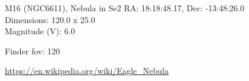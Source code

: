 \begin{block}{M16 (NGC6611), Nebula in Se2}
    RA: 18:18:48.17, Dec: -13:48:26.0 \\ 
    Dimensions: 120.0 x 25.0 \\ 
    Magnitude (V): 6.0



    Finder fov: 120 

    \url{https://en.wikipedia.org/wiki/Eagle_Nebula} 
\end{block}